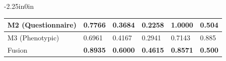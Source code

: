 \documentclass[10pt,letterpaper]{article}
\begin{document}
\begin{table}[!t]
\begin{adjustwidth}{-2.25in}{0in}
\begin{tabular}{|p{3.0cm}|p{2.0cm}|p{2.0cm}|p{2.0cm}|p{2.0cm}|p{2.0cm}|}
                                                                                                                          M2 (Questionnaire)
                                                                                                                          & 0.7766
                                                                                                                          & 0.3684
                                                                                                                          & 0.2258
                                                                                                                          & 1.0000
                                                                                                                          & 0.504 \\
                                                                                                                          \hline

                                                                                                                          M3 (Phenotypic)
                                                                                                                          & 0.6961
                                                                                                                          & 0.4167
                                                                                                                          & 0.2941
                                                                                                                          & 0.7143
                                                                                                                          & 0.885 \\
                                                                                                                          \hline

                                                                                                                          Fusion
                                                                                                                          & \textbf{0.8935}
                                                                                                                          & \textbf{0.6000}
                                                                                                                          & \textbf{0.4615}
                                                                                                                          & \textbf{0.8571}
                                                                                                                          & \textbf{0.500} \\
                                                                                                                          \hline


\end{tabular}
\end{adjustwidth}
\end{table}
\end{document}
